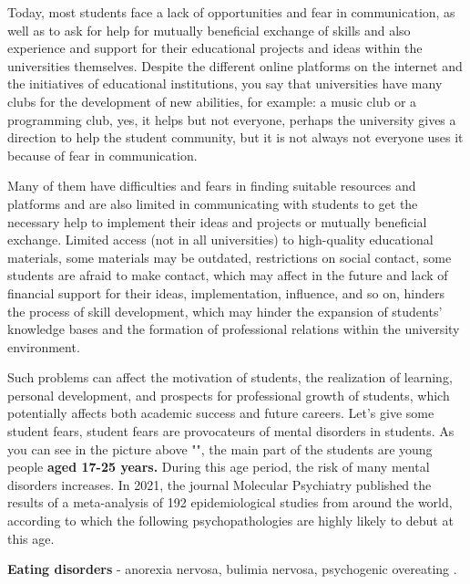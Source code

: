 \vspace{0.5cm}
Today, most students face a lack of opportunities and fear in communication, as well as to ask for help for mutually beneficial exchange of skills and also experience and support for their educational projects and ideas within the universities themselves. Despite the different online platforms on the internet and the initiatives of educational institutions, you say that universities have many clubs for the development of new abilities, for example: a music club or a programming club, yes, it helps but not everyone, perhaps the university gives a direction to help the student community, but it is not always not everyone uses it because of fear in communication. 
\par
\vspace{0.5cm}
Many of them have difficulties and fears in finding suitable resources and platforms and are also limited in communicating with students to get the necessary help to implement their ideas and projects or mutually beneficial exchange.  
\newpage
Limited access (not in all universities) to high-quality educational materials, some materials may be outdated, restrictions on social contact, some students are afraid to make contact, which may affect in the future and lack of financial support for their ideas, implementation, influence, and so on, hinders the process of skill development, which may hinder the expansion of students' knowledge bases and the formation of professional relations within the university environment. 
\par
\vspace{0.5cm}
Such problems can affect the motivation of students, the realization of learning, personal development, and prospects for professional growth of students, which potentially affects both academic success and future careers.
Let's give some student fears, student fears are provocateurs of mental disorders in students.
As you can see in the picture above "", the main part of the students are young people \textbf{aged 17-25 years.} During this age period, the risk of many mental disorders increases. 
In 2021, the journal Molecular Psychiatry \cite{student-fears} published the results of a meta-analysis of 192 epidemiological studies from around the world, according to which the following psychopathologies are highly likely to debut at this age.

\par
\vspace{0.5cm}
\textbf{Eating disorders} - anorexia nervosa, bulimia nervosa, psychogenic overeating \cite{student-fears}.

